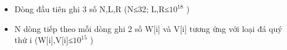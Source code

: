 \begin{itemize}
	\item     Dòng đầu tiên ghi 3 số N,L,R (N≤32; L,R≤$10^{18}$    )   
	\item     N dòng tiếp theo mỗi dòng ghi 2 số W[i] và V[i] tương ứng với loại đá quý thứ i (W[i],V[i]≤$10^{15}$    )   
\end{itemize}